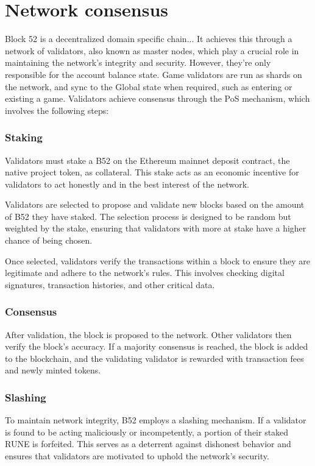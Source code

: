 \documentclass{article}
\begin{document}
\section{Network consensus}
Block 52 is a decentralized domain specific chain... It achieves this through a network of validators, also known as master nodes, which play a crucial role in maintaining the network's integrity and security. However, they're only responsible for the account balance state.  Game validators are run as shards on the network, and sync to the Global state when required, such as entering or existing a game.  Validators achieve consensus through the PoS mechanism, which involves the following steps:

\subsubsection*{Staking}
Validators must stake a B52 on the Ethereum mainnet deposit contract, the native project token, as collateral. This stake acts as an economic incentive for validators to act honestly and in the best interest of the network.

Validators are selected to propose and validate new blocks based on the amount of B52 they have staked. The selection process is designed to be random but weighted by the stake, ensuring that validators with more at stake have a higher chance of being chosen.

Once selected, validators verify the transactions within a block to ensure they are legitimate and adhere to the network's rules. This involves checking digital signatures, transaction histories, and other critical data.

\subsubsection*{Consensus}
After validation, the block is proposed to the network. Other validators then verify the block's accuracy. If a majority consensus is reached, the block is added to the blockchain, and the validating validator is rewarded with transaction fees and newly minted tokens.

\subsubsection*{Slashing}
To maintain network integrity, B52 employs a slashing mechanism. If a validator is found to be acting maliciously or incompetently, a portion of their staked RUNE is forfeited. This serves as a deterrent against dishonest behavior and ensures that validators are motivated to uphold the network's security.
\end{document}
